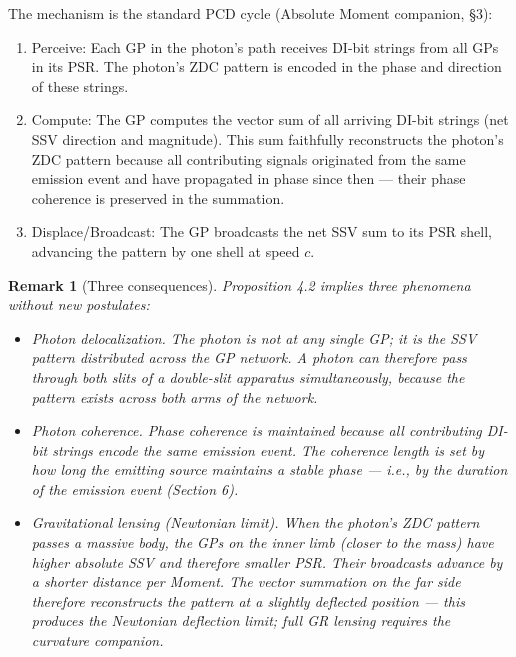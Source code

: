 \documentclass[12pt]{article}
\newtheorem{remark}[theorem]{Remark}
\begin{document}
The mechanism is the standard PCD cycle (Absolute Moment companion, §3):
\begin{enumerate}[noitemsep]
\item Perceive: Each GP in the photon’s path receives DI-bit strings from all GPs in its PSR. The photon’s ZDC pattern is encoded in the phase and direction of these strings.
\item Compute: The GP computes the vector sum of all arriving DI-bit strings (net SSV direction and magnitude). This sum faithfully reconstructs the photon’s ZDC pattern because all contributing signals originated from the same emission event and have propagated in phase since then — their phase coherence is preserved in the summation.
\item Displace/Broadcast: The GP broadcasts the net SSV sum to its PSR shell, advancing the pattern by one shell at speed \(c\).
\end{enumerate}

\begin{remark}[Three consequences]
Proposition 4.2 implies three phenomena without new postulates:
\begin{itemize}
\item Photon delocalization. The photon is not at any single GP; it is the SSV pattern distributed across the GP network. A photon can therefore pass through both slits of a double-slit apparatus simultaneously, because the pattern exists across both arms of the network.
\item Photon coherence. Phase coherence is maintained because all contributing DI-bit strings encode the same emission event. The coherence length is set by how long the emitting source maintains a stable phase — i.e., by the duration of the emission event (Section 6).
\item Gravitational lensing (Newtonian limit). When the photon’s ZDC pattern passes a massive body, the GPs on the inner limb (closer to the mass) have higher absolute SSV and therefore smaller PSR. Their broadcasts advance by a shorter distance per Moment. The vector summation on the far side therefore reconstructs the pattern at a slightly deflected position — this produces the Newtonian deflection limit; full GR lensing requires the curvature companion.
\end{itemize}
\end{remark}
\end{document}
